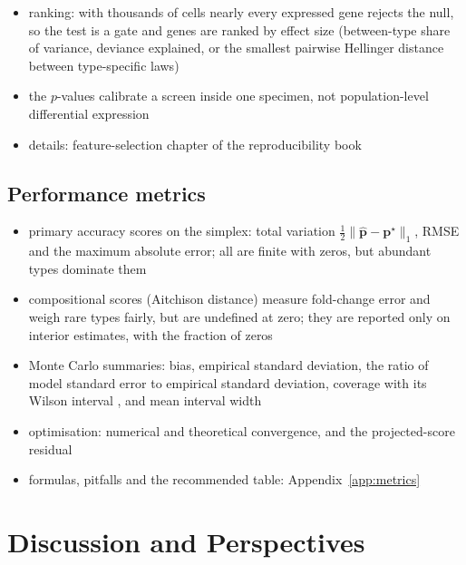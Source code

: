 \documentclass[pdflatex, sn-nature]{sn-jnl}
\theoremstyle{thmstyleone}%
\theoremstyle{thmstyletwo}%
\theoremstyle{thmstylethree}%
\begin{document}
\begin{itemize}
\begin{itemize}
          \cite{meinshausenStabilitySelection2010}; it does not generate a null
  \end{itemize}
  \item ranking: with thousands of cells nearly every expressed gene rejects the null, so the test is a gate
        and genes are ranked by effect size (between-type share of variance, deviance explained, or the
        smallest pairwise Hellinger distance between type-specific laws)
  \item the \(p\)-values calibrate a screen inside one specimen, not population-level differential expression
  \item details: feature-selection chapter of the reproducibility book
\end{itemize}

\subsection{Performance metrics}
\label{sec:metrics}

\begin{itemize}
  \item primary accuracy scores on the simplex: total variation \(\tfrac12\lVert\hat{\boldsymbol{p}}-\boldsymbol{p}^{\star}\rVert_{1}\),
        RMSE and the maximum absolute error; all are finite with zeros, but abundant types dominate them
  \item compositional scores (Aitchison distance) measure fold-change error and weigh rare types fairly, but are
        undefined at zero; they are reported only on interior estimates, with the fraction of zeros
        \cite{aitchisonStatisticalAnalysisCompositional1982}
  \item Monte Carlo summaries: bias, empirical standard deviation, the ratio of model standard error to
        empirical standard deviation, coverage with its Wilson interval \cite{wilsonProbableInferenceLaw1927},
        and mean interval width
  \item optimisation: numerical and theoretical convergence, and the projected-score residual
  \item formulas, pitfalls and the recommended table: Appendix~\ref{app:metrics}
\end{itemize}

\section{Discussion and Perspectives}
\label{sec:perspectives}
\end{document}
